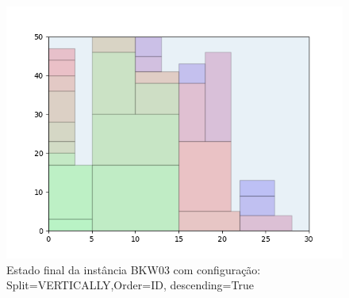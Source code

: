 \begin{figure}[H]
    \centering
    \caption[]{Estado final da instância BKW03 com configuração: Split=VERTICALLY,Order=ID, descending=True}
    \label{fig:bkw03-vertically-id-true}
    \includegraphics[scale=0.5]{output/figures/bkw/bkw03/vertically/id/true/00}
\end{figure}